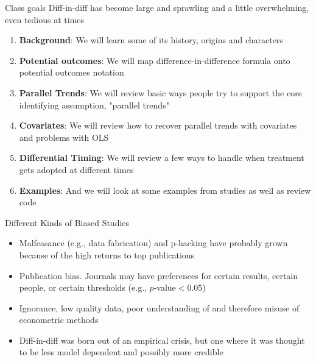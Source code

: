 \documentclass{beamer}
\begin{document}
\begin{frame}{Class goals}
Diff-in-diff has become large and sprawling and a little overwhelming, even tedious at times

  \begin{enumerate}
    \item \textbf{Background}: We will learn some of its history, origins and characters
    \item \textbf{Potential outcomes}: We will map difference-in-difference formula onto potential outcomes notation
    \item \textbf{Parallel Trends}: We will review basic ways people try to support the core identifying assumption, "parallel trends"
    \item \textbf{Covariates}: We will review how to recover parallel trends with covariates and problems with OLS
    \item \textbf{Differential Timing}: We will review a few ways to handle when treatment gets adopted at different times
    \item \textbf{Examples}: And we will look at some examples from studies as well as review code
  \end{enumerate}

\end{frame}



\begin{frame}{Different Kinds of Biased Studies}

\begin{itemize}
\item Malfeasance (e.g., data fabrication) and p-hacking have probably grown because of the high returns to top publications
\item Publication bias.  Journals may have preferences for certain results, certain people, or certain thresholds (e.g., $p$-value$<0.05$)
\item Ignorance, low quality data, poor understanding of and therefore misuse of econometric methods
\item Diff-in-diff was born out of an empirical crisis, but one where it was thought to be less model dependent and possibly more credible 

\end{itemize}

\end{frame}
\end{document}
